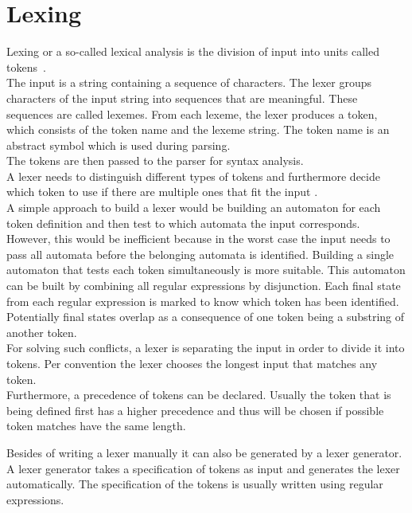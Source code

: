\section{Lexing}\label{sec:BackgroundLexer}

Lexing or a so-called lexical analysis is the division of input into units called tokens~\cite{LexYacc.1992}.\\
The input is a string containing a sequence of characters.
The lexer groups characters of the input string into sequences that are meaningful. These sequences are called lexemes. From each lexeme, the lexer produces a token, which consists of the token name and the lexeme string. The token name is an abstract symbol which is used during parsing. \cite{Aho.2007} \\
The tokens are then passed to the parser for syntax analysis.\\
A lexer needs to distinguish different types of tokens and furthermore decide which token to use if there are multiple ones that fit the input \cite{Mogensen.2017}.\\
A simple approach to build a lexer would be building an automaton for each token definition and then test to which automata the input corresponds.\\
However, this would be inefficient because in the worst case the input needs to pass all automata before the belonging automata is identified.
Building a single automaton that tests each token simultaneously is more suitable.
This automaton can be built by combining all regular expressions by disjunction.
Each final state from each regular expression is marked to know which token has been identified.\\
Potentially final states overlap as a consequence of one token being a substring of another token. \\
For solving such conflicts, a lexer is separating the input in order to divide it into tokens.
Per convention the lexer chooses the longest input that matches any token.~\cite{Mogensen.2017} \\
Furthermore, a precedence of tokens can be declared. Usually the token that is being defined first has a higher precedence and thus will be chosen if possible token matches have the same length. \cite{Mogensen.2017}

Besides of writing a lexer manually it can also be generated by a lexer generator.
A lexer generator takes a specification of tokens as input and generates the lexer automatically. 
The specification of the tokens is usually written using regular expressions. 

